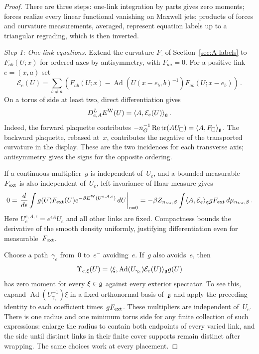\begin{proof}
There are three steps: one-link integration by parts gives zero moments; forces realize every linear functional vanishing on Maxwell jets; products of forces and curvature measurements, averaged, represent equation labels up to a triangular regrading, which is then inverted.

\emph{Step 1: One-link equations.} Extend the curvature $F_\square$ of Section~\ref{sec:A-labels} to $F_{ab}(U;x)$ for ordered axes by antisymmetry, with $F_{aa}=0$. For a positive link $e=(x,a)$ set
\begin{equation*}
\mathcal E_e(U)=\sum_{b\ne a}\left(F_{ab}(U;x)-\operatorname{Ad}(U(x-e_b,b)^{-1})F_{ab}(U;x-e_b)\right)\,.
\end{equation*}
On a torus of side at least two, direct differentiation gives
\begin{equation}\label{eq:A-link-equation}
D^L_{e,A}E^{\rm W}(U)=\langle A,\mathcal E_e(U)\rangle_{\mathfrak{g}}\,.
\end{equation}
Indeed, the forward plaquette contributes $-n_G^{-1}\operatorname{Re}\operatorname{tr}(AU_\square)=\langle A,F_\square\rangle_{\mathfrak{g}}$. The backward plaquette, rebased at~$x$, contributes the negative of the transported curvature in the display. These are the two incidences for each transverse axis; antisymmetry gives the signs for the opposite ordering.

If a continuous multiplier~$g$ is independent of~$U_e$, and a bounded measurable~$F_{\rm ext}$ is also independent of~$U_e$, left invariance of Haar measure gives
\begin{equation*}
0=\left.\frac{d}{d\epsilon}\int g(U)F_{\rm ext}(U)e^{-\beta E^{\rm W}(U^{e,A,\epsilon})}\,dU\right|_{\epsilon=0}
=-\beta Z_{n_{\rm tor},\beta}\int\langle A,\mathcal E_e\rangle_{\mathfrak{g}}gF_{\rm ext}\,d\mu_{n_{\rm tor},\beta}\,.
\end{equation*}
Here $U^{e,A,\epsilon}_e=e^{\epsilon A}U_e$ and all other links are fixed. Compactness bounds the derivative of the smooth density uniformly, justifying differentiation even for measurable~$F_{\rm ext}$.

Choose a path~$\gamma_e$ from~$0$ to~$e^-$ avoiding~$e$. If~$g$ also avoids~$e$, then
\begin{equation*}
\Upsilon_{e,\xi}(U)=\langle \xi,\operatorname{Ad}(U_{\gamma_e})\mathcal E_e(U)\rangle_{\mathfrak{g}}g(U)
\end{equation*}
has zero moment for every $\xi\in\mathfrak{g}$ against every exterior spectator. To see this, expand $\operatorname{Ad}(U_{\gamma_e}^{-1})\xi$ in a fixed orthonormal basis of~$\mathfrak{g}$ and apply the preceding identity to each coefficient times~$gF_{\rm ext}$. These multipliers are independent of~$U_e$. There is one radius and one minimum torus side for any finite collection of such expressions: enlarge the radius to contain both endpoints of every varied link, and the side until distinct links in their finite cover supports remain distinct after wrapping. The same choices work at every placement.


\end{proof}
